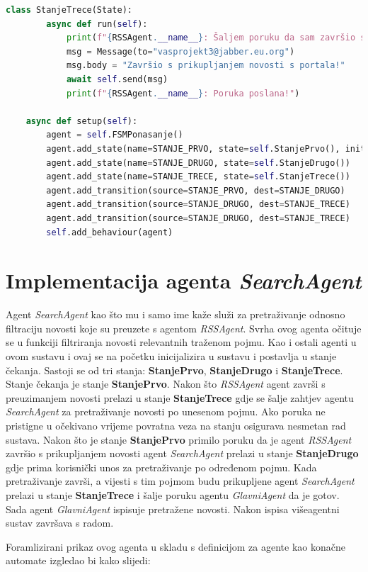 \documentclass[]{foi} %
\begin{document}
\begin{lstlisting}[language=Python, caption={Programski kôd za RSSAgent agenta}]
    class StanjeTrece(State):
        async def run(self):
            print(f"{RSSAgent.__name__}: Šaljem poruku da sam završio s prikupljanjem novosti ...")
            msg = Message(to="vasprojekt3@jabber.eu.org")
            msg.body = "Završio s prikupljanjem novosti s portala!"
            await self.send(msg)
            print(f"{RSSAgent.__name__}: Poruka poslana!")

    async def setup(self):
        agent = self.FSMPonasanje()
        agent.add_state(name=STANJE_PRVO, state=self.StanjePrvo(), initial=True)
        agent.add_state(name=STANJE_DRUGO, state=self.StanjeDrugo())
        agent.add_state(name=STANJE_TRECE, state=self.StanjeTrece())
        agent.add_transition(source=STANJE_PRVO, dest=STANJE_DRUGO)
        agent.add_transition(source=STANJE_DRUGO, dest=STANJE_TRECE)
        agent.add_transition(source=STANJE_DRUGO, dest=STANJE_TRECE)
        self.add_behaviour(agent)
\end{lstlisting}
\section{Implementacija agenta \textit{SearchAgent}}
Agent \textit{SearchAgent} kao što mu i samo ime kaže služi za pretraživanje odnosno filtraciju novosti koje su preuzete s agentom \textit{RSSAgent}. Svrha ovog agenta očituje se u funkciji filtriranja novosti relevantnih traženom pojmu. Kao i ostali agenti u ovom sustavu i ovaj se na početku inicijalizira u sustavu i postavlja u stanje čekanja. Sastoji se od tri stanja: \textbf{StanjePrvo}, \textbf{StanjeDrugo} i \textbf{StanjeTrece}. Stanje čekanja je stanje \textbf{StanjePrvo}. Nakon što \textit{RSSAgent} agent završi s preuzimanjem novosti prelazi u stanje \textbf{StanjeTrece} gdje se šalje zahtjev agentu \textit{SearchAgent} za pretraživanje novosti po unesenom pojmu. Ako poruka ne pristigne u očekivano vrijeme povratna veza na stanju osigurava nesmetan rad sustava. Nakon što je stanje \textbf{StanjePrvo} primilo poruku da je agent \textit{RSSAgent} završio s prikupljanjem novosti agent \textit{SearchAgent} prelazi u stanje \textbf{StanjeDrugo} gdje prima korisnički unos za pretraživanje po određenom pojmu. Kada pretraživanje završi, a vijesti s tim pojmom budu prikupljene agent \textit{SearchAgent} prelazi u stanje \textbf{StanjeTrece} i šalje poruku agentu \textit{GlavniAgent} da je gotov. Sada agent \textit{GlavniAgent} ispisuje pretražene novosti. Nakon ispisa višeagentni sustav završava s radom. 

Foramlizirani prikaz ovog agenta u skladu s definicijom za agente kao konačne automate izgledao bi kako slijedi:
\end{document}
